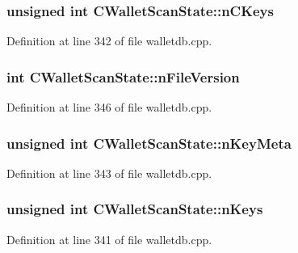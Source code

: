 \subsubsection[{n\+C\+Keys}]{\setlength{\rightskip}{0pt plus 5cm}unsigned int C\+Wallet\+Scan\+State\+::n\+C\+Keys}\label{class_c_wallet_scan_state_ae1316ee4cfdf8fbff91ca32a5d0f2b6a}


Definition at line 342 of file walletdb.\+cpp.

\hypertarget{class_c_wallet_scan_state_ad68ce61566ee2baf3d7b04b1390942d1}{}
\subsubsection[{n\+File\+Version}]{\setlength{\rightskip}{0pt plus 5cm}int C\+Wallet\+Scan\+State\+::n\+File\+Version}\label{class_c_wallet_scan_state_ad68ce61566ee2baf3d7b04b1390942d1}


Definition at line 346 of file walletdb.\+cpp.

\hypertarget{class_c_wallet_scan_state_a2cfbc8894839188b57be22e72f2d6de4}{}
\subsubsection[{n\+Key\+Meta}]{\setlength{\rightskip}{0pt plus 5cm}unsigned int C\+Wallet\+Scan\+State\+::n\+Key\+Meta}\label{class_c_wallet_scan_state_a2cfbc8894839188b57be22e72f2d6de4}


Definition at line 343 of file walletdb.\+cpp.

\hypertarget{class_c_wallet_scan_state_a8a6e0071320cbfffc6d7d49ded5d506e}{}
\subsubsection[{n\+Keys}]{\setlength{\rightskip}{0pt plus 5cm}unsigned int C\+Wallet\+Scan\+State\+::n\+Keys}\label{class_c_wallet_scan_state_a8a6e0071320cbfffc6d7d49ded5d506e}


Definition at line 341 of file walletdb.\+cpp.

